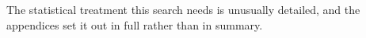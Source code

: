 The statistical treatment this search needs is unusually detailed, and the
appendices set it out in full rather than in summary.

